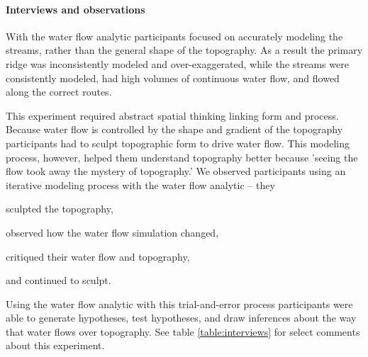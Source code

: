 \documentclass[prodmode,acmtochi]{acmsmall} %
\begin{document}
\paragraph{Interviews and observations}
With the water flow analytic
participants focused on accurately modeling the streams, 
rather than the general shape of the topography. 
As a result the primary ridge was inconsistently modeled and over-exaggerated,
while the streams were consistently modeled,
had high volumes of continuous water flow, 
and flowed along the correct routes.

This experiment required abstract spatial thinking linking form and process. 
Because water flow is controlled by the shape and gradient of the topography
participants had to sculpt topographic form to drive water flow. 
This modeling process, however, helped them understand topography better 
because 'seeing the flow took away the mystery of topography.'
%
We observed participants using an iterative modeling process 
with the water flow analytic -- 
they 
\begin{enumerate*}[label=\alph*),font=\itshape]
\item sculpted the topography, 
\item observed how the water flow simulation changed, 
\item critiqued their water flow and topography, 
\item and continued to sculpt.
\end{enumerate*}
%
Using the water flow analytic with this trial-and-error process
participants were able to generate hypotheses, test hypotheses, and draw inferences 
about the way that water flows over topography. 
See table \ref{table:interviews} for select comments about this experiment.
%

\end{document}
